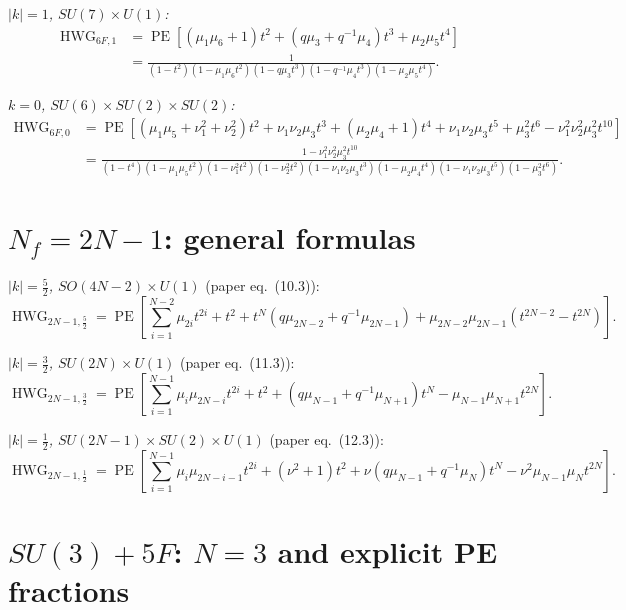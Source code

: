 \documentclass[9pt]{article}
\newcommand{\PE}{\operatorname{PE}}
\newcommand{\HWG}{\operatorname{HWG}}
\begin{document}
\emph{$|k|=1$, $SU(7)\times U(1)$:}
\begin{align}
\HWG_{6F,1}
&=\PE\!\left[(\mu_1\mu_6+1)t^2+(q\mu_3+q^{-1}\mu_4)t^3+\mu_2\mu_5t^4\right]\\
&=\frac{1}{(1-t^2)(1-\mu_1\mu_6t^2)(1-q\mu_3t^3)(1-q^{-1}\mu_4t^3)(1-\mu_2\mu_5t^4)}.
\end{align}

\emph{$k=0$, $SU(6)\times SU(2)\times SU(2)$:}
\begin{align}
\HWG_{6F,0}
&=\PE\!\left[
(\mu_1\mu_5+\nu_1^2+\nu_2^2)t^2
+\nu_1\nu_2\mu_3t^3
+(\mu_2\mu_4+1)t^4
+\nu_1\nu_2\mu_3t^5
+\mu_3^2t^6
-\nu_1^2\nu_2^2\mu_3^2t^{10}
\right]\\
&=\frac{1-\nu_1^2\nu_2^2\mu_3^2t^{10}}
{(1-t^4)(1-\mu_1\mu_5t^2)(1-\nu_1^2t^2)(1-\nu_2^2t^2)
 (1-\nu_1\nu_2\mu_3t^3)(1-\mu_2\mu_4t^4)
 (1-\nu_1\nu_2\mu_3t^5)(1-\mu_3^2t^6)}.
\end{align}

\newpage
\section*{$N_f=2N-1$: general formulas}

\emph{$|k|=\frac52$, $SO(4N-2)\times U(1)$} (paper eq.~(10.3)):
\begin{equation}
\HWG_{2N-1,\frac52}=\PE\!\left[
\sum_{i=1}^{N-2}\mu_{2i}t^{2i}+t^2
+t^N\left(q\mu_{2N-2}+q^{-1}\mu_{2N-1}\right)
+\mu_{2N-2}\mu_{2N-1}\left(t^{2N-2}-t^{2N}\right)
\right].
\end{equation}

\emph{$|k|=\frac32$, $SU(2N)\times U(1)$} (paper eq.~(11.3)):
\begin{equation}
\HWG_{2N-1,\frac32}=\PE\!\left[
\sum_{i=1}^{N-1}\mu_i\mu_{2N-i}t^{2i}+t^2
+\left(q\mu_{N-1}+q^{-1}\mu_{N+1}\right)t^N
-\mu_{N-1}\mu_{N+1}t^{2N}
\right].
\end{equation}

\emph{$|k|=\frac12$, $SU(2N-1)\times SU(2)\times U(1)$} (paper eq.~(12.3)):
\begin{equation}
\HWG_{2N-1,\frac12}=\PE\!\left[
\sum_{i=1}^{N-1}\mu_i\mu_{2N-i-1}t^{2i}
+(\nu^2+1)t^2
+\nu\left(q\mu_{N-1}+q^{-1}\mu_N\right)t^N
-\nu^2\mu_{N-1}\mu_Nt^{2N}
\right].
\end{equation}

\section*{$SU(3)+5F$: $N=3$ and explicit PE fractions}
\end{document}
